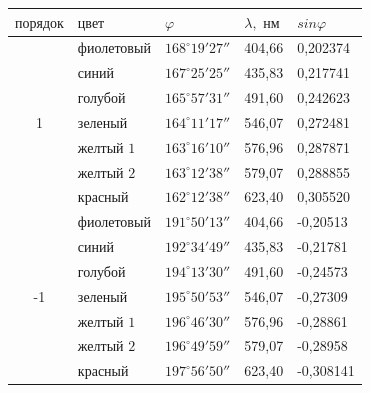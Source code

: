\documentclass[a4paper,12pt]{article} %
\begin{document}
\begin{table}[h!]
\begin{tabular}{|c|l|l|l|l|}
\hline
\multicolumn{1}{|l|}{$\text{порядок}$} & $\text{цвет}$       & $\varphi$               & $\lambda, \text{ нм}$ & $sin\varphi$ \\ \hline
\multirow{7}{*}{1}                     & $\text{фиолетовый}$ & $168^\circ 19' 27''$ & 404,66                & 0,202374  \\ \cline{2-5} 
                                       & $\text{синий}$      & $167^\circ 25' 25''$ & 435,83                & 0,217741  \\ \cline{2-5} 
                                       & $\text{голубой}$    & $165^\circ 57' 31''$ & 491,60                & 0,242623  \\ \cline{2-5} 
                                       & $\text{зеленый}$    & $164^\circ 11' 17''$ & 546,07                & 0,272481  \\ \cline{2-5} 
                                       & $\text{желтый 1}$   & $163^\circ 16' 10''$ & 576,96                & 0,287871  \\ \cline{2-5} 
                                       & $\text{желтый 2}$   & $163^\circ 12' 38''$ & 579,07                & 0,288855  \\ \cline{2-5} 
                                       & $\text{красный}$    & $162^\circ 12' 38''$ & 623,40                & 0,305520  \\ \hline
\multirow{7}{*}{-1}                    & $\text{фиолетовый}$ & $191^\circ 50' 13''$ & 404,66                & -0,20513  \\ \cline{2-5} 
                                       & $\text{синий}$      & $192^\circ 34' 49''$ & 435,83                & -0,21781  \\ \cline{2-5} 
                                       & $\text{голубой}$    & $194^\circ 13' 30''$ & 491,60                & -0,24573  \\ \cline{2-5} 
                                       & $\text{зеленый}$    & $195^\circ 50' 53''$ & 546,07                & -0,27309  \\ \cline{2-5} 
                                       & $\text{желтый 1}$   & $196^\circ 46' 30''$ & 576,96                & -0,28861  \\ \cline{2-5} 
                                       & $\text{желтый 2}$   & $196^\circ 49' 59''$ & 579,07                & -0,28958  \\ \cline{2-5} 
                                       & $\text{красный}$    & $197^\circ 56' 50''$ & 623,40                & -0,308141 \\ \hline
\end{tabular}
\end{table}
\end{document}
